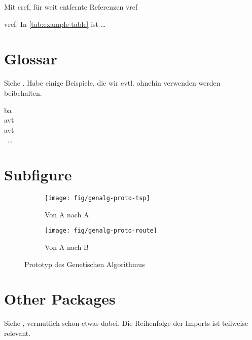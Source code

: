 Mit cref, für weit entfernte Referenzen vref

vref: In \vref{tab:example-table} ist \dots


\section{Glossar}
Siehe . Habe einige Beispiele, die wir evtl. ohnehin verwenden werden beibehalten.

\gls{ba} \\
\acs{avt}\\
\acf{avt} \\\
\dots

\section{Subfigure}

\begin{figure}[H]
	\centering
	\begin{subfigure}{0.49\textwidth}
		\centering
		\texttt{[image: fig/genalg-proto-tsp]}
		\caption{Von A nach A}
		\label{fig:genalg-proto-tsp}
	\end{subfigure}
	\begin{subfigure}{0.49\textwidth}
		\centering
		\texttt{[image: fig/genalg-proto-route]}
		\caption{Von A nach B}
		\label{fig:genalg-proto-route}
	\end{subfigure}
	\caption{Prototyp des Genetischen Algorithmus}
	\label{fig:testImage}
\end{figure}

\section{Other Packages}
Siehe , vermutlich schon etwas dabei. Die Reihenfolge der Imports ist teilweise relevant.
